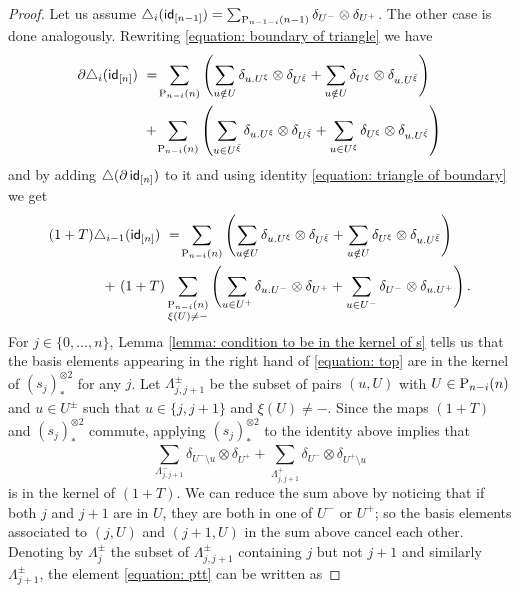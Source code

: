 \begin{proof}
	Let us assume $\triangle_i(\id_{[n-1]}) = \sum_{\P_{n-1-i}(n-1)} \delta_{U^-} \otimes \delta_{U^+}$. The other case is done analogously. Rewriting \eqref{equation: boundary of triangle} we have
    \begin{align*}
    \partial \triangle_i(\id_{[n]})\ & =\! \sum_{\P_{n-i}(n)} \left(\sum_{u \notin U} \delta_{u.U^\xi} \otimes \delta_{U^{\bar{\xi}}} +
    \sum_{u \notin U} \delta_{U^\xi} \otimes \delta_{u.U^{\bar{\xi}}} \right) \\ & +\!
    \sum_{\P_{n-i}(n)} \left(\sum_{u \in U^{\bar{\xi}}} \delta_{u.U^\xi} \otimes \delta_{U^{\bar{\xi}}} +
    \sum_{u \in U^{\xi}} \delta_{U^\xi} \otimes \delta_{u.U^{\bar{\xi}}} \right)
    \end{align*}
    and by adding $\triangle(\partial \, \id_{[n]})$ to it and using identity \eqref{equation: triangle of boundary} we get
    \begin{align}
    (1 + T) \triangle_{i-1}(\id_{[n]})\ & =\! \sum_{\P_{n-i}(n)} \left(\sum_{u \notin U} \delta_{u.U^\xi} \otimes \delta_{U^{\bar{\xi}}} +
    \sum_{u \notin U} \delta_{U^\xi} \otimes \delta_{u.U^{\bar{\xi}}} \right) \label{equation: top}\\ +\
    (1 + T) & \sum_{\substack{\P_{n-i}(n) \\ \xi(U) \neq -}} \left(\sum_{u \in U^+} \delta_{u.U^-} \otimes \delta_{U^{+}} +
    \sum_{u \in U^-} \delta_{U^-} \otimes \delta_{u.U^+} \right).
    \end{align}
    For $j \in \{0, \dots, n\}$, Lemma \ref{lemma: condition to be in the kernel of s} tells us that the basis elements appearing in the right hand of \eqref{equation: top} are in the kernel of $(s_j)_\ast^{\otimes 2}$ for any $j$. Let $\Lambda_{j, j+1}^\pm$ be the subset of pairs $(u, U)$ with $U \in \P_{n-i}(n)$ and $u \in U^\pm$ such that $u \in \{j, j+1\}$ and $\xi(U) \neq -$. Since the maps $(1+T)$ and $(s_j)_\ast^{\otimes 2}$ commute, applying $(s_j)_\ast^{\otimes 2}$ to the identity above implies that
    \begin{equation} \label{equation: ptt}
    \sum_{\Lambda_{j, j+1}^-} \delta_{U^- \setminus u} \otimes \delta_{U^+} +
    \sum_{\Lambda_{j, j+1}^+} \delta_{U^-} \otimes \delta_{U^+ \setminus u}
    \end{equation}
    is in the kernel of $(1+T)$. We can reduce the sum above by noticing that if both $j$ and $j+1$ are in $U$, they are both in one of $U^-$ or $U^+$; so the basis elements associated to $(j, U)$ and $(j+1, U)$ in the sum above cancel each other. Denoting by $\Lambda^\pm_j$ the subset of $\Lambda^\pm_{j, j+1}$ containing $j$ but not $j+1$ and similarly $\Lambda^\pm_{j+1}$, the element \eqref{equation: ptt} can be written as

\end{proof}
